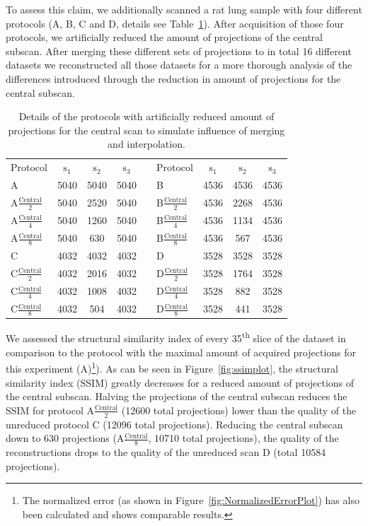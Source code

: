 \documentclass{article}
\begin{document}
To assess this claim, we additionally scanned a rat lung sample with four different protocols (A, B, C and D, details see Table~\ref{tab:abcd}). After acquisition of those four protocols, we artificially reduced the amount of projections of the central subscan. After merging these different sets of projections to in total 16 different datasets we reconstructed all those datasets for a more thorough analysis of the differences introduced through the reduction in amount of projections for the central subscan.

\begin{table}
	\centering
	\caption{Details of the protocols with artificially reduced amount of projections for the central scan to simulate influence of merging and interpolation.}
	\begin{tabular}{lcccclccc}
		Protocol & $\textrm{s}_{1}$ & $\textrm{s}_{2}$ & $\textrm{s}_{3}$ & & Protocol & $\textrm{s}_{1}$ & $\textrm{s}_{2}$ & $\textrm{s}_{3}$ \\
		A & 5040 & 5040 & 5040 & & B & 4536 & 4536 & 4536 \\
		A$\frac{\textrm{Central}}{2}$ & 5040 & 2520 & 5040 & & B$\frac{\textrm{Central}}{2}$ & 4536 & 2268 & 4536 \\
		A$\frac{\textrm{Central}}{4}$ & 5040 & 1260 & 5040 & & B$\frac{\textrm{Central}}{4}$ & 4536 & 1134 & 4536 \\
		A$\frac{\textrm{Central}}{8}$ & 5040 & 630 & 5040 & & B$\frac{\textrm{Central}}{8}$ & 4536 & 567 & 4536 \\
		\hline
		C & 4032 & 4032 & 4032 & & D & 3528 & 3528 & 3528 \\
		C$\frac{\textrm{Central}}{2}$ & 4032 & 2016 & 4032 & & D$\frac{\textrm{Central}}{2}$ & 3528 & 1764 & 3528 \\
		C$\frac{\textrm{Central}}{4}$ & 4032 & 1008 & 4032 & & D$\frac{\textrm{Central}}{4}$ & 3528 & 882 & 3528 \\
		C$\frac{\textrm{Central}}{8}$ & 4032 & 504 & 4032 & & D$\frac{\textrm{Central}}{8}$ & 3528 & 441 & 3528 \\
	\end{tabular} 
	\label{tab:abcd}
\end{table}

We assessed the structural similarity index \cite{Wang2004} of every 35\textsuperscript{th} slice of the dataset in comparison to the protocol with the maximal amount of acquired projections for this experiment (A)\footnote{The normalized error (as shown in Figure~\ref{fig:NormalizedErrorPlot}) has also been calculated and shows comparable results.}). As can be seen in Figure~\ref{fig:ssimplot}, the structural similarity index (SSIM) greatly decreases for a reduced amount of projections of the central subscan. Halving the projections of the central subscan reduces the SSIM for protocol A$\frac{\textrm{Central}}{2}$ (12600 total projections) lower than the quality of the unreduced protocol C (12096 total projections). Reducing the central subscan down to 630 projections (A$\frac{\textrm{Central}}{8}$, 10710 total projections), the quality of the reconstructions drops to the quality of the unreduced scan D (total 10584 projections). 
\end{document}
